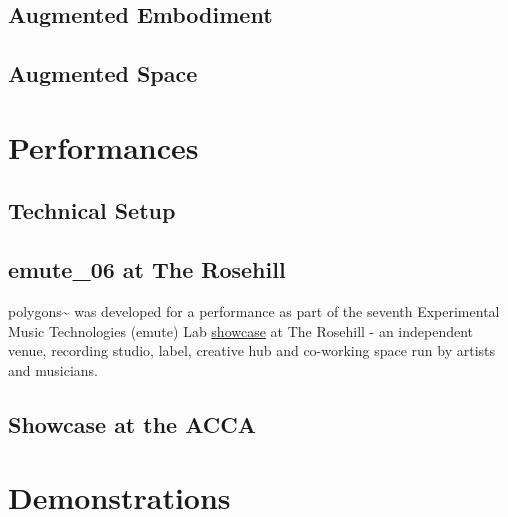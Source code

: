 \subsection{Augmented Embodiment} \label{sec: polygons-composition-embodiment}



\subsection{Augmented Space} \label{sec: polygons-composition-space}




\section{Performances} \label{sec: polygons-performances}
\subsection{Technical Setup} \label{sec: polygons-performances-setup}

\subsection{emute\_06 at The Rosehill} \label{sec: polygons-performances-rosehill}
polygons\textasciitilde{} was developed for a performance as part of the seventh Experimental Music Technologies (emute) Lab \href{http://www.emutelab.org/blog/emutelab6}{showcase} at The Rosehill - an independent venue, recording studio, label, creative hub and co-working space run by artists and musicians.

\subsection{Showcase at the ACCA} \label{sec: polygons-performances-acca}



\section{Demonstrations} \label{sec: polygons-demonstrations}
